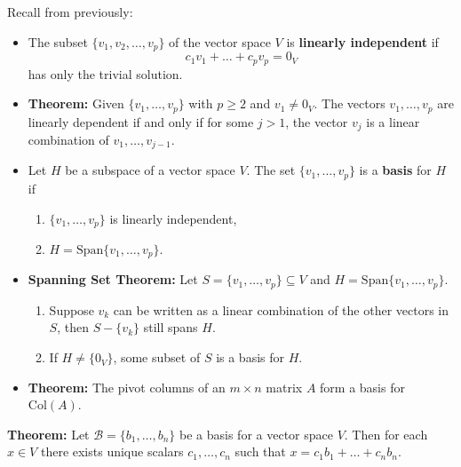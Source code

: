 \documentclass[12pt,letterpaper]{article}
\begin{document}
\thispagestyle{fancy}

Recall from previously:

\begin{itemize}
\item 	The subset $\{ v_1, v_2, \dots, v_p\}$ of the vector space $V$ is {\bf linearly independent} if $$c_1 v_1+\dots+ c_p v_p =0_V$$ has only the trivial solution.
\item {\bf Theorem:} Given $\{ v_1, \dots, v_p\}$ with $p\geq 2$ and $v_1\neq 0_V$. The vectors $v_1, \dots, v_p$ are linearly dependent if and only if for some $j>1$, the vector $v_j$ is a linear combination of $v_1, \dots, v_{j-1}$.
\item Let $H$ be a subspace of a vector space $V$. The set $\{v_1, \dots, v_p\}$ is a {\bf basis} for $H$ if
	\begin{enumerate}
		\item  $\{v_1, \dots, v_p\}$ is linearly independent,
		\item $H=\text{Span}\{v_1, \dots, v_p \}$.
	\end{enumerate}
\item {\bf Spanning Set Theorem:} Let $S=\{ v_1,\dots,v_p\} \subseteq V$ and $H=\text{Span}\{v_1,\dots, v_p \}$.
\begin{enumerate}
	\item Suppose $v_k$ can be written as a linear combination of the other vectors in $S$, then $S-\{v_k\}$ still spans $H$.
	\item If $H\neq \{ 0_V\}$, some subset of $S$ is a basis for $H$.
\end{enumerate} 
\item {\bf Theorem:} The pivot columns of an $m \times n$ matrix $A$ form a basis for $\text{Col}(A)$.
\end{itemize}

\newpage

{\bf Theorem:} Let $\mathcal{B} =\{b_1, \dots, b_n\}$ be a basis for a  vector space $V$. Then for each $x \in V$ there exists unique scalars $c_1,\dots, c_n$ such that $x=c_1 b_1+\dots+ c_n b_n$.
\end{document}

